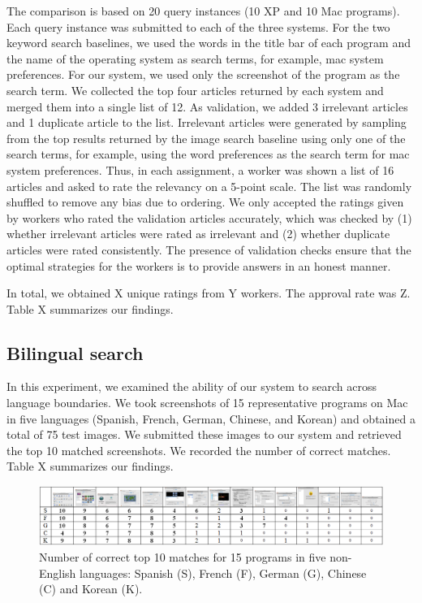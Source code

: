 \documentclass{www2010-submission}
\begin{document}
The comparison is based on 20 query instances (10 XP and 10 Mac
programs). Each query instance was submitted to each of the three
systems. For the two keyword search baselines, we used the words in
the title bar of each program and the name of the operating system as
search terms, for example, mac system preferences. For our system, we
used only the screenshot of the program as the search term. We
collected the top four articles returned by each system and merged
them into a single list of 12. As validation, we added 3 irrelevant
articles and 1 duplicate article to the list. Irrelevant articles were
generated by sampling from the top results returned by the image
search baseline using only one of the search terms, for example, using
the word preferences as the search term for mac system
preferences. Thus, in each assignment, a worker was shown a list of 16
articles and asked to rate the relevancy on a 5-point scale. The list
was randomly shuffled to remove any bias due to ordering.  We only
accepted the ratings given by workers who rated the validation
articles accurately, which was checked by (1) whether irrelevant
articles were rated as irrelevant and (2) whether duplicate articles
were rated consistently. The presence of validation checks
ensure that the optimal strategies for the workers is to
provide answers in an honest manner.

In total, we obtained X unique ratings from Y workers. The 
approval rate was Z. Table X summarizes our findings. 

\subsection{Bilingual search}

In this experiment, we examined the ability of our system to search
across language boundaries. We took screenshots of 15 representative
programs on Mac in five languages (Spanish, French, German,
Chinese, and Korean) and obtained a total of 75 test
images.  We submitted these images to our 
system and retrieved the top 10 matched screenshots. We recorded
the number of correct matches. Table X summarizes
our findings.

\begin{figure}
\includegraphics[width=2\columnwidth]{figure/bilingual_search.png}
\caption{Number of correct top 10 matches for 15 programs in five non-English
languages: Spanish (S), French (F), German (G), Chinese (C) and Korean (K).}
\end{figure}
\end{document}
